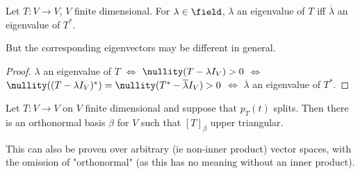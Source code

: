 \begin{corollary}\label{cor:eigenvaluesofadjoint}
    Let $T : V \to V$, $V$ finite dimensional. For $\lambda \in \field$, $\lambda$ an eigenvalue of $T$ iff $\overline{\lambda}$ an eigenvalue of $T^\ast$.
\end{corollary}

\begin{remark}
    But the corresponding eigenvectors may be different in general.
\end{remark}

\begin{proof}
    $\lambda$ an eigenvalue of $T$ $\iff$ $\nullity(T - \lambda I_V) > 0$ $\iff$ $\nullity((T - \lambda I_V)^\ast) = \nullity(T^\ast - \overline{\lambda} I_V) > 0$ $\iff$ $\overline{\lambda}$ an eigenvalue of $T^\ast$.
\end{proof}

\begin{lemma}\label{lemma:schurs}
    Let $T : V \to V$ on $V$ finite dimensional and suppose that $p_T(t)$ splits. Then there is an orthonormal basis $\beta$ for $V$ such that $[T]_\beta$ upper triangular.
\end{lemma}

\begin{remark}
    This can also be proven over arbitrary (ie non-inner product) vector spaces, with the omission of "orthonormal" (as this has no meaning without an inner product).
\end{remark}

